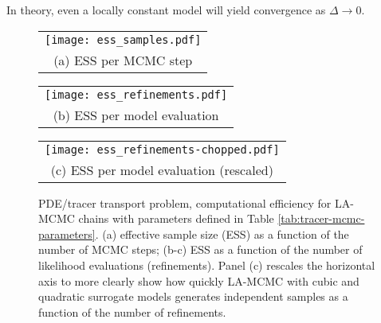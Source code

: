 %
%
In theory, even a locally constant model will yield convergence as $\Delta \to 0$. 


\begin{figure}
  \centering

  
  \begin{tabular}{@{}c@{}}
    \texttt{[image: ess\_samples.pdf]} \\[\abovecaptionskip]
    \small (a) ESS per MCMC step 
  \end{tabular}
  
  \begin{tabular}{@{}c@{}}
    \texttt{[image: ess\_refinements.pdf]} \\[\abovecaptionskip]
    \small (b) ESS per model evaluation
  \end{tabular}

    \begin{tabular}{@{}c@{}}
    \texttt{[image: ess\_refinements-chopped.pdf]} \\[\abovecaptionskip]
    \small (c) ESS per model evaluation (rescaled)
  \end{tabular}
  
  \caption{PDE/tracer transport problem, computational efficiency for LA-MCMC chains with parameters defined in Table \ref{tab:tracer-mcmc-parameters}. (a) effective sample size (ESS) as a function of the number of MCMC steps; (b-c) ESS as a function of the number of likelihood evaluations (refinements). Panel (c) rescales the horizontal axis to more clearly show how quickly LA-MCMC with cubic and quadratic surrogate models generates independent samples as a function of the number of refinements.}
  \label{fig:tracer-autocorrelation-ess}
\end{figure}


